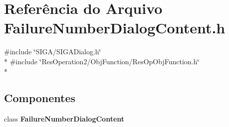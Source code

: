 \section{Referência do Arquivo Failure\+Number\+Dialog\+Content.\+h}
\label{_2_obj_function_2_failure_number_2_failure_number_dialog_content_8h}
{\ttfamily \#include \char`\"{}S\+I\+G\+A/\+S\+I\+G\+A\+Dialog.\+h\char`\"{}}\\*
{\ttfamily \#include \char`\"{}Res\+Operation2/\+Obj\+Function/\+Res\+Op\+Obj\+Function.\+h\char`\"{}}\\*
\subsection*{Componentes}
\begin{DoxyCompactItemize}
\item 
class {\bf Failure\+Number\+Dialog\+Content}
\end{DoxyCompactItemize}
